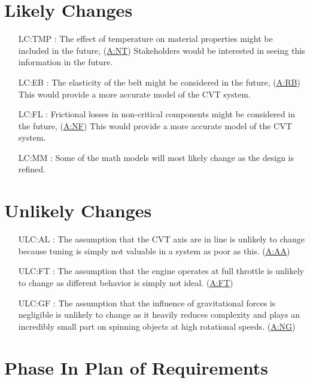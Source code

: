 \documentclass[12pt]{article}
\newcommand{\hpref}[1]{\hyperref[#1]{#1}}
\begin{document}
\section{Likely Changes}    

\noindent \begin{itemize}

\item[LC:TMP \label{LC:TMP}:] The effect of temperature on material properties might be included in the future, (\hpref{A:NT}) Stakeholders would be interested in seeing this information in the future.
\item[LC:EB \label{LC:EB}:] The elasticity of the belt might be considered in the future, (\hpref{A:RB}) This would provide a more accurate model of the CVT system.
\item[LC:FL \label{LC:FL}:] Frictional losses in non-critical components might be considered in the future, (\hpref{A:NF}) This would provide a more accurate model of the CVT system.
\item[LC:MM \label{LC:MM}:] Some of the math models will most likely change as the design is refined.

\end{itemize}

\section{Unlikely Changes}    

\begin{itemize}

  \item[ULC:AL \label{ULC:AL}:] The assumption that the CVT axis are in line is unlikely to change because tuning is simply not valuable in a system as poor as this. (\hpref{A:AA})
  \item[ULC:FT \label{ULC:FT}:] The assumption that the engine operates at full throttle is unlikely to change as different behavior is simply not ideal. (\hpref{A:FT})
  \item[ULC:GF \label{ULC:GF}:] The assumption that the influence of gravitational forces is negligible is unlikely to change as it heavily reduces complexity and plays an incredibly small part on spinning objects at high rotational speeds. (\hpref{A:NG})
  
  \end{itemize}

  \section{Phase In Plan of Requirements}
\end{document}
